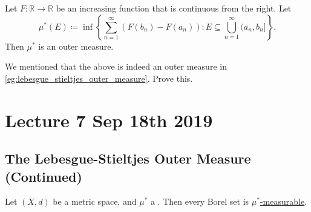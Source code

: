 \documentclass[notoc,notitlepage]{tufte-book}
\begin{document}
\begin{defn}\label{defn:lebesgue_stieltjes_outer_measure}
  Let $F : \mathbb{R} \to \mathbb{R}$ be an increasing function
  that is continuous from the right.
  Let
  \begin{equation*}
    \mu^*(E) \coloneqq \inf \left\{ 
      \sum_{n=1}^{\infty} ( F(b_n) - F(a_n) )
      : E \subseteq \bigcup_{n=1}^{\infty} (a_n, b_n]
    \right\}.
  \end{equation*}
  Then $\mu^*$ is an outer measure.
\end{defn}

\begin{ex}
  We mentioned that the above is indeed an outer measure in
  \cref{eg:lebesgue_stieltjes_outer_measure}.
  Prove this.
\end{ex}



\chapter{Lecture 7 Sep 18th 2019}%
\label{chp:lecture_7_sep_18th_2019}

\section{The Lebesgue-Stieltjes Outer Measure (Continued)}%
\label{sec:the_lebesgue_stieltjes_outer_measure_continued}

\begin{thm}\label{thm:caratheodory_s_second_theorem}
  Let $(X, d)$ be a metric space,
  and $\mu^*$ a .
  Then every Borel set is \hyperref[defn:_mu_star_measurability]{$\mu^*$-measurable}.
\end{thm}
\end{document}
